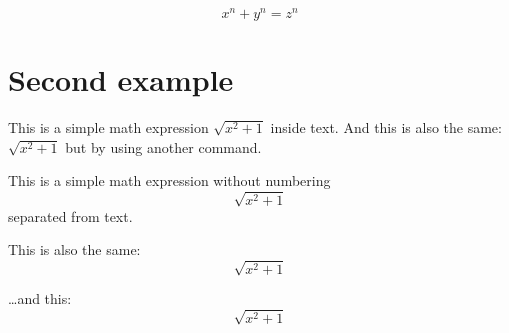 \documentclass{article}
\begin{document}
\[ x^n + y^n = z^n \]

\section{Second example}

This is a simple math expression \(\sqrt{x^2+1}\) inside text. 
And this is also the same: 
\begin{math}
    \sqrt{x^2+1}
\end{math}
but by using another command.

This is a simple math expression without numbering
\[\sqrt{x^2+1}\] 
separated from text.

This is also the same:
\begin{displaymath}
    \sqrt{x^2+1}
\end{displaymath}

\ldots and this:
\begin{equation*}
    \sqrt{x^2+1}
\end{equation*}
\end{document}
